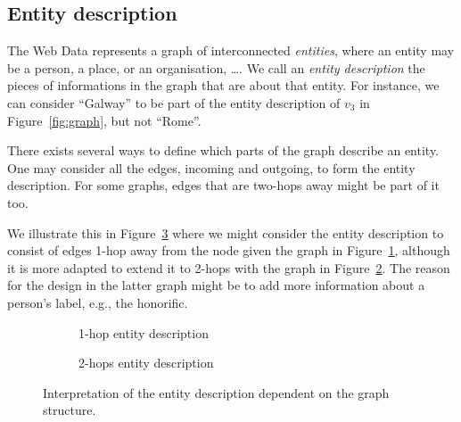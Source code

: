 \subsection{Entity description}
\label{sec:entity-description}

The Web Data represents a graph of interconnected \emph{entities}, where an entity may be a person, a place, or an organisation, \ldots. We call an \emph{entity description} the pieces of informations in the graph that are about that entity. For instance, we can consider ``Galway'' to be part of the entity description of $v_3$ in Figure~\ref{fig:graph}, but not ``Rome''.

There exists several ways to define which parts of the graph describe an entity. One may consider all the edges, incoming and outgoing, to form the entity description. For some graphs, edges that are two-hops away might be part of it too.

We illustrate this in Figure~\ref{fig:edesc} where we might consider the entity description to consist of edges 1-hop away from the node given the graph in Figure~\ref{fig:edesc1}, although it is more adapted to extend it to 2-hops with the graph in Figure~\ref{fig:edesc2}. The reason for the design in the latter graph might be to add more information about a person's label, e.g., the honorific.

\begin{figure}
	\centering
	\begin{subfigure}[b]{.45\textwidth}
		\resizebox{.6\textwidth}{!}{
			
		}
		\caption{1-hop entity description}
		\label{fig:edesc1}
	\end{subfigure}
	\quad
	\begin{subfigure}[b]{.45\textwidth}
		\resizebox{\textwidth}{!}{
			
		}
		\caption{2-hops entity description}
		\label{fig:edesc2}
	\end{subfigure}
	\caption{Interpretation of the entity description dependent on the graph structure.}
	\label{fig:edesc}
\end{figure}

%


